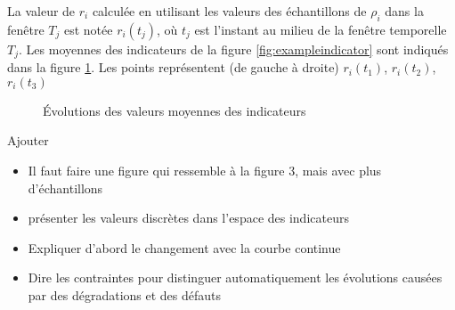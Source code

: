 \documentclass{article}
\begin{document}
La valeur de $r_i$ calculée en utilisant les valeurs des échantillons de $\rho_i$ dans la fenêtre $T_j$ est notée $r_i(t_j)$, où $t_j$ est l'instant au milieu de la fenêtre temporelle $T_j$.
Les moyennes des indicateurs de la figure \ref{fig:exampleindicator} sont indiqués dans la figure \ref{fig:exampleindicateurmoyen}. Les points représentent (de gauche à droite) $r_i(t_1)$, $r_i(t_2)$, $r_i(t_3)$



\begin{figure}[H]
\centering
{}
\caption{Évolutions des valeurs moyennes des indicateurs}
\label{fig:exampleindicateurmoyen}
\end{figure}
Ajouter

\begin{itemize}
    \item Il faut faire une figure qui ressemble à la figure 3, mais avec plus d'échantillons
    \item présenter les valeurs discrètes dans l'espace des indicateurs
    \item Expliquer d'abord le changement avec la courbe continue
    \item Dire les contraintes pour distinguer automatiquement les évolutions causées par des dégradations et des défauts
\end{itemize}
\end{document}
